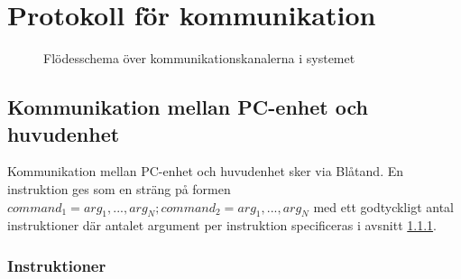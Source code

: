 \section{Protokoll för kommunikation}

\begin{figure}[H]
\center
\scalebox{0.6}{}
\caption{Flödesschema över kommunikationskanalerna i systemet}
\end{figure}

\subsection{Kommunikation mellan PC-enhet och huvudenhet}\label{designspec:protokoll}

Kommunikation mellan PC-enhet och huvudenhet sker via Blåtand. En instruktion ges som en sträng på formen $command_{1}=arg_{1},...,arg_{N};command_{2}=arg_{1},...,arg_{N}$ med ett godtyckligt antal instruktioner där antalet argument per instruktion specificeras i avsnitt \ref{designspec-protokoll-pc-huvud-kommandon}.

\subsubsection{Instruktioner} \label{designspec-protokoll-pc-huvud-kommandon}

